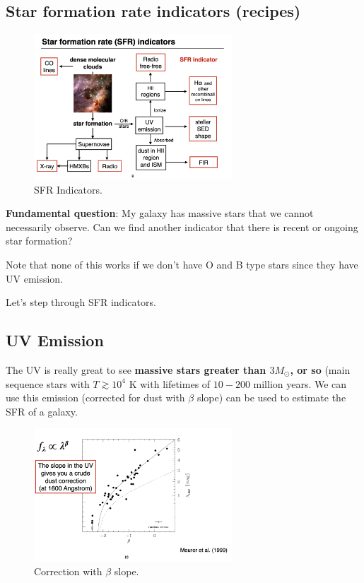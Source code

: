 \documentclass{article}
\def\msun{M_\odot}
\begin{document}
\subsection{Star formation rate indicators (recipes)}

\begin{figure}
    \centering
    \includegraphics[width=0.66\textwidth]{figs/Screen Shot 2021-09-24 at 3.35.38 PM.png}
    \caption{SFR Indicators.}
    \label{fig:sfr_indicators}
\end{figure}

\textbf{Fundamental question}: My galaxy has massive stars that we cannot necessarily observe. Can we find another indicator that there is recent or ongoing star formation?

Note that none of this works if we don't have O and B type stars since they have UV emission. 

Let's step through SFR indicators.

\subsection{UV Emission}

The UV is really great to see \textbf{massive stars greater than $3\msun$, or so} (main sequence stars with $T \gtrsim 10^{4}$ K with lifetimes of $10-200$ million years. We can use this emission (corrected for dust with $\beta$ slope) can be used to estimate the SFR of a galaxy. 
\begin{figure}
    \centering
    \includegraphics[width=0.66\textwidth]{figs/Screen Shot 2021-09-24 at 3.36.55 PM.png}
    \caption{Correction with $\beta$ slope.}
    \label{fig:beta_slope}
\end{figure}
\end{document}
